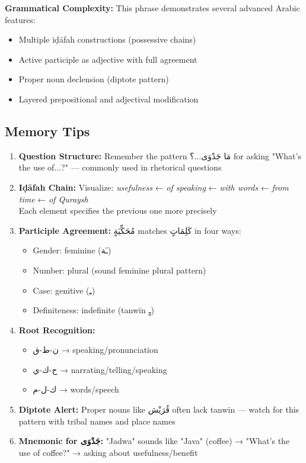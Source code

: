 \documentclass[letterpaper,12pt]{article}
\begin{document}
\begin{tcolorbox}[colback=boxcolor,colframe=accentcolor,title=\textbf{Cultural and Linguistic Context},breakable]
\textbf{Grammatical Complexity:}
This phrase demonstrates several advanced Arabic features:
\begin{itemize}
\item Multiple iḍāfah constructions (possessive chains)
\item Active participle as adjective with full agreement
\item Proper noun declension (diptote pattern)
\item Layered prepositional and adjectival modification
\end{itemize}
\end{tcolorbox}

\subsection{Memory Tips}

\begin{enumerate}
\item \textbf{Question Structure:} Remember the pattern \textarabic{مَا جَدْوَى...؟} for asking "What's the use of...?" — commonly used in rhetorical questions

\item \textbf{Iḍāfah Chain:} Visualize: \textit{usefulness} ← \textit{of speaking} ← \textit{with words} ← \textit{from time} ← \textit{of Quraysh}\\
Each element specifies the previous one more precisely

\item \textbf{Participle Agreement:} \textarabic{مُحَكِّيَةٍ} matches \textarabic{كَلِمَاتٍ} in four ways:
\begin{itemize}
\item Gender: feminine (\textarabic{ـَة})
\item Number: plural (sound feminine plural pattern)
\item Case: genitive (\textarabic{ـِ})
\item Definiteness: indefinite (tanwīn \textarabic{ـٍ})
\end{itemize}

\item \textbf{Root Recognition:} 
\begin{itemize}
\item \textarabic{ن-ط-ق} → speaking/pronunciation
\item \textarabic{ح-ك-ي} → narrating/telling/speaking
\item \textarabic{ك-ل-م} → words/speech
\end{itemize}

\item \textbf{Diptote Alert:} Proper nouns like \textarabic{قُرَيْش} often lack tanwīn — watch for this pattern with tribal names and place names

\item \textbf{Mnemonic for \textarabic{جَدْوَى}:} "Jadwa" sounds like "Java" (coffee) → "What's the use of coffee?" → asking about usefulness/benefit
\end{enumerate}
\end{document}
